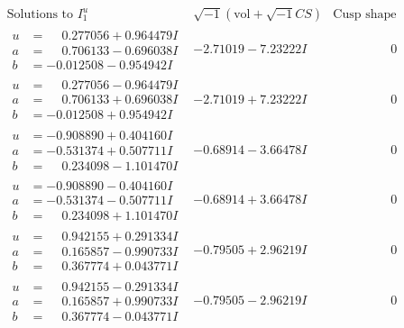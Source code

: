 \documentclass[1p]{elsarticle_modified}
\theoremstyle{definition}
\newcommand{\I}{\sqrt{-1}}
\begin{document}
$$\begin{array}{c|c|c}  
\text{Solutions to }I^u_{1}& \I (\text{vol} + \sqrt{-1}CS) & \text{Cusp shape}\\
 \hline 
\begin{aligned}
u &= \phantom{-}0.277056 + 0.964479 I \\
a &= \phantom{-}0.706133 - 0.696038 I \\
b &= -0.012508 - 0.954942 I\end{aligned}
 & -2.71019 - 7.23222 I & \phantom{-0.000000 } 0 \\ \hline\begin{aligned}
u &= \phantom{-}0.277056 - 0.964479 I \\
a &= \phantom{-}0.706133 + 0.696038 I \\
b &= -0.012508 + 0.954942 I\end{aligned}
 & -2.71019 + 7.23222 I & \phantom{-0.000000 } 0 \\ \hline\begin{aligned}
u &= -0.908890 + 0.404160 I \\
a &= -0.531374 + 0.507711 I \\
b &= \phantom{-}0.234098 - 1.101470 I\end{aligned}
 & -0.68914 - 3.66478 I & \phantom{-0.000000 } 0 \\ \hline\begin{aligned}
u &= -0.908890 - 0.404160 I \\
a &= -0.531374 - 0.507711 I \\
b &= \phantom{-}0.234098 + 1.101470 I\end{aligned}
 & -0.68914 + 3.66478 I & \phantom{-0.000000 } 0 \\ \hline\begin{aligned}
u &= \phantom{-}0.942155 + 0.291334 I \\
a &= \phantom{-}0.165857 - 0.990733 I \\
b &= \phantom{-}0.367774 + 0.043771 I\end{aligned}
 & -0.79505 + 2.96219 I & \phantom{-0.000000 } 0 \\ \hline\begin{aligned}
u &= \phantom{-}0.942155 - 0.291334 I \\
a &= \phantom{-}0.165857 + 0.990733 I \\
b &= \phantom{-}0.367774 - 0.043771 I\end{aligned}
 & -0.79505 - 2.96219 I & \phantom{-0.000000 } 0 \\ \hline\begin{aligned}

\end{aligned}
\end{array}$$
\end{document}
